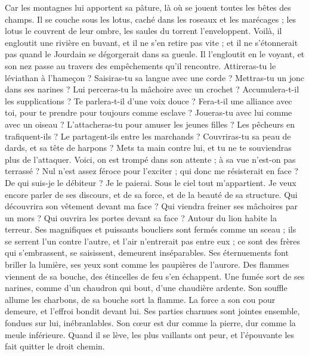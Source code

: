 \begin{multicols}{2}
Car les montagnes lui apportent sa pâture, là où se jouent toutes les bêtes des champs.
Il se couche sous les lotus, caché dans les roseaux et les marécages ;
les lotus le couvrent de leur ombre, les saules du torrent l'enveloppent.
Voilà, il engloutit une rivière en buvant, et il ne s'en retire pas vite ; et il ne s'étonnerait pas quand le Jourdain se dégorgerait dans sa gueule. 
Il l'engloutit en le voyant, et son nez passe au travers des empêchements qu'il rencontre.  
Attireras-tu le léviathan à l'hameçon ? Saisiras-tu sa langue avec une corde ?
Mettras-tu un jonc dans ses narines ? Lui perceras-tu la mâchoire avec un crochet ?
Accumulera-t-il les supplications ? Te parlera-t-il d'une voix douce ?
Fera-t-il une alliance avec toi, pour te prendre pour toujours comme esclave ?
Joueras-tu avec lui comme avec un oiseau ? L'attacheras-tu pour amuser les jeunes filles ?
Les pêcheurs en trafiquent-ils ? Le partagent-ils entre les marchands ?
Couvriras-tu sa peau de dards, et sa tête de harpons ?
Mets ta main contre lui, et tu ne te souviendras plus de l'attaquer.
Voici, on est trompé dans son attente ; à sa vue n'est-on pas terrassé ?
\VerseOne{}Nul n'est assez féroce pour l'exciter ; qui donc me résisterait en face ?
De qui suis-je le débiteur ? Je le paierai. Sous le ciel tout m'appartient.
Je veux encore parler de ses discours, et de sa force, et de la beauté de sa structure.
Qui découvrira son vêtement devant ma face ? Qui viendra freiner ses mâchoires par un mors ?
Qui ouvrira les portes devant sa face ? Autour du lion habite la terreur.
Ses magnifiques et puissants boucliers sont fermés comme un sceau ;
ils se serrent l'un contre l'autre, et l'air n'entrerait pas entre eux ;
ce sont des frères qui s'embrassent, se saisissent, demeurent inséparables.
Ses éternuements font briller la lumière, ses yeux sont comme les paupières de l'aurore.
Des flammes viennent de sa bouche, des étincelles de feu s'en échappent.
Une fumée sort de ses narines, comme d'un chaudron qui bout, d'une chaudière ardente.
Son souffle allume les charbons, de sa bouche sort la flamme.
La force a son cou pour demeure, et l'effroi bondit devant lui.
Ses parties charnues sont jointes ensemble, fondues sur lui, inébranlables.
Son cœur est dur comme la pierre, dur comme la meule inférieure.
Quand il se lève, les plus vaillants ont peur, et l'épouvante les fait quitter le droit chemin.

\end{multicols}
